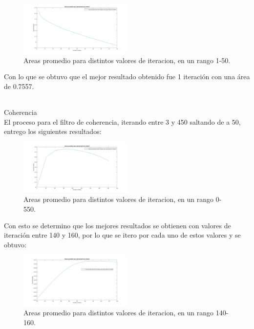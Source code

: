 \begin{figure}[h]
	{
	\centering
	\includegraphics[width=0.50\textwidth]{Figures/AnisotropicoRangoChico}
	\caption[An Electron]{Areas promedio para distintos valores de iteracion, en un rango 1-50.}
	}
\end{figure}

Con lo que se obtuvo que el mejor resultado obtenido fue 1 iteración con una área de 0.7557.

\\Coherencia\\
El proceso para el filtro de coherencia, iterando entre 3 y 450 saltando de a 50, entrego los siguientes resultados:

\begin{figure}[h]
	{
	\centering
	\includegraphics[width=0.50\textwidth]{Figures/CoherenciaRangoGrande}
	\caption[An Electron]{Areas promedio para distintos valores de iteracion, en un rango 0-550.}
	}
\end{figure}

Con esto se determino que los mejores resultados se obtienen con valores de iteración entre 140 y 160, por lo que se itero por cada uno de estos valores y se obtuvo:

\begin{figure}[h]
	{
	\centering
	\includegraphics[width=0.50\textwidth]{Figures/CoherenciaRangoChico}
	\caption[An Electron]{Areas promedio para distintos valores de iteracion, en un rango 140-160.}
	}
	\end{figure}


